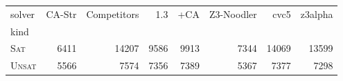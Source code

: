 \begin{tabular}{lrrrrrrr}
\toprule
solver & CA-Str & Competitors & \Ostrich{} 1.3 & \Ostrich{}+CA & Z3-Noodler & cvc5 & z3alpha \\
kind &  &  &  &  &  &  &  \\
\midrule
\textsc{Sat} & 6411 & 14207 & 9586 & 9913 & 7344 & 14069 & 13599 \\
\textsc{Unsat} & 5566 & 7574 & 7356 & 7389 & 5367 & 7377 & 7298 \\
\bottomrule
\end{tabular}
